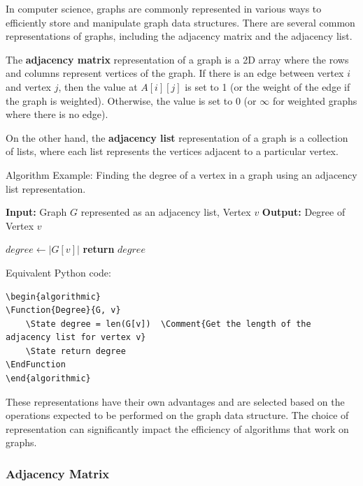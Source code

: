 \documentclass[12pt]{book} %
\begin{document}
In computer science, graphs are commonly represented in various ways to efficiently store and manipulate graph data structures. There are several common representations of graphs, including the adjacency matrix and the adjacency list.

The \textbf{adjacency matrix} representation of a graph is a 2D array where the rows and columns represent vertices of the graph. If there is an edge between vertex $i$ and vertex $j$, then the value at $A[i][j]$ is set to 1 (or the weight of the edge if the graph is weighted). Otherwise, the value is set to 0 (or $\infty$ for weighted graphs where there is no edge).

On the other hand, the \textbf{adjacency list} representation of a graph is a collection of lists, where each list represents the vertices adjacent to a particular vertex.

Algorithm Example: Finding the degree of a vertex in a graph using an adjacency list representation.
\FloatBarrier
\begin{algorithm}
\caption{Find Degree of a Vertex using Adjacency List}
\begin{algorithmic}
\State \textbf{Input:} Graph $G$ represented as an adjacency list, Vertex $v$
\State \textbf{Output:} Degree of Vertex $v$

    \State $degree \gets |G[v]|$ 
    \State \textbf{return} $degree$
\EndFunction
\end{algorithmic}
\end{algorithm}
\FloatBarrier
Equivalent Python code:
\FloatBarrier
\begin{lstlisting}
\begin{algorithmic}
\Function{Degree}{G, v}
    \State degree = len(G[v])  \Comment{Get the length of the adjacency list for vertex v}
    \State return degree
\EndFunction
\end{algorithmic}
\end{lstlisting}
\FloatBarrier
These representations have their own advantages and are selected based on the operations expected to be performed on the graph data structure. The choice of representation can significantly impact the efficiency of algorithms that work on graphs.

\subsubsection{Adjacency Matrix}
\end{document}
